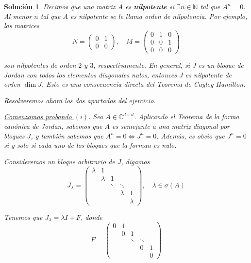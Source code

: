 \documentclass[11pt, a4paper]{article}
\newif\IfInSansMode
\numberwithin{equation}{section}
\theoremstyle{theorem-style}
\theoremstyle{definition-style}
\theoremstyle{remark-style}
\newtheorem*{sol}{Solución}
\theoremstyle{example-style}
\begin{document}
    \begin{sol}
        Decimos que una matriz $A$ es \textbf{nilpotente} si $\exists n \in \mathbb{N}$ tal
        que $A^n = 0$. Al menor $n$ tal que $A$ es nilpotente se le llama \textit{orden de nilpotencia}. Por ejemplo, las matrices
        $$ N = \begin{pmatrix}
            0 & 1 \\
            0 & 0
        \end{pmatrix}, \quad M = 
        \begin{pmatrix}
            0 & 1 & 0 \\
            0 & 0 & 1\\
            0 & 0 & 0
        \end{pmatrix}$$

        son nilpotentes de orden $2$ y $3$, respectivamente. En general, si $J$ es un bloque de Jordan con todos los elementos diagonales nulos, entonces $J$ es nilpotente de orden $\dim J$. Esto es una consecuencia directa del \textit{Teorema de Cayley-Hamilton}.

        Resolveremos ahora los dos apartados del ejercicio.

        \underline{Comenzamos probando $(i)$}. Sea $A \in \mathbb{C}^{d\times d}$. Aplicando el \textit{Teorema de la forma canónica de Jordan}, sabemos que $A$ es semejante a una matriz diagonal por bloques $J$, y también sabemos que $A^n = 0 \iff J^n = 0$. Además, es obvio que $J^n = 0$ si y solo si cada uno de los bloques que la forman es nulo.
        
        
        
        Consideremos un bloque arbitrario de $J$, digamos $$J_\lambda = \begin{pmatrix}
	\lambda & 1\\
	& \lambda & 1 \\
	& & \ddots & \ddots \\
	& & & \lambda & 1 \\
	& & & & \lambda
\end{pmatrix}, \quad \lambda \in \sigma(A)$$


Tenemos que $J_\lambda = \lambda I + F$, donde $$F = \begin{pmatrix}
	0 & 1\\
	& 0 & 1 \\
	& & \ddots & \ddots \\
	& & & 0 & 1 \\
	& & & & 0
\end{pmatrix}$$


\end{sol}
\end{document}
